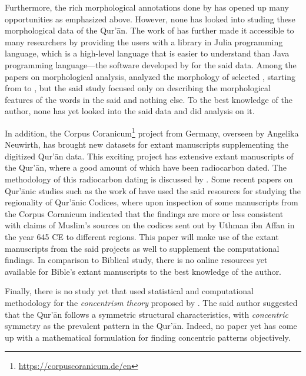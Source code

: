 Furthermore, the rich morphological annotations done by  has opened up many opportunities as emphasized above. However, none has looked into studing these morphological data of the Qur'\=an. The work of  has further made it accessible to many researchers by providing the users with a library in Julia programming language, which is a high-level language that is easier to understand than Java programming language---the software developed by  for the said data. Among the papers on morphological analysis,  analyzed the morphology of selected  , starting from   to  , but the said study focused only on describing the morphological features of the words in the said   and nothing else. To the best knowledge of the author, none has yet looked into the said data and did analysis on it.

In addition, the Corpus Coranicum\footnote{\url{https://corpuscoranicum.de/en}} project from Germany, overseen by Angelika Neuwirth, has brought new datasets for extant manuscripts supplementing the digitized Qur'\=an data. This exciting project has extensive extant manuscripts of the Qur'\=an, where a good amount of which have been radiocarbon dated. The methodology of this radiocarbon dating is discussed by \cite{Radiocarbon14CDatingofQurnManuscripts}. Some recent papers on Qur'\=anic studies such as the work of \cite{sidky2020} have used the said resources for studying the regionality of Qur'\=anic Codices, where upon inspection of some manuscripts from the Corpus Coranicum indicated that the findings are more or less consistent with claims of Muslim's sources on the codices sent out by Uthman ibn Affan  in the year 645 CE to different regions. This paper will make use of the extant manuscripts from the said projects as well to supplement the computational findings. In comparison to Biblical study, there is no online resources yet available for Bible's extant manuscripts to the best knowledge of the author.

Finally, there is no study yet that used statistical and computational methodology for the \textit{concentrism theory} proposed by . The said author suggested that the Qur'\=an follows a symmetric structural characteristics, with \textit{concentric} symmetry as the prevalent pattern in the Qur'\=an. Indeed, no paper yet has come up with a mathematical formulation for finding concentric patterns objectively.

